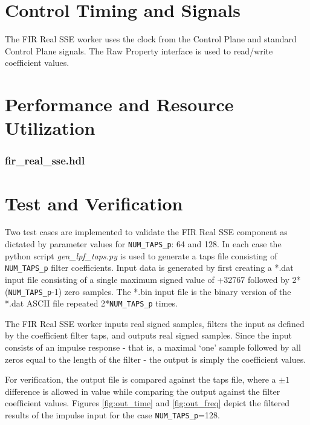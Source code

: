 \documentclass{article}
\def\comp{fir\_real\_sse}
\edef\ecomp{fir_real_sse}
\begin{document}
\section*{Control Timing and Signals}
\begin{flushleft}
	The FIR Real SSE worker uses the clock from the Control Plane and standard Control Plane signals. The Raw Property interface is used to read/write coefficient values.
\end{flushleft}

\section*{Performance and Resource Utilization}
\subsubsection*{\comp.hdl}

\section*{Test and Verification}
\begin{flushleft}
Two test cases are implemented to validate the FIR Real SSE component as dictated by parameter values for \verb+NUM_TAPS_p+: 64 and 128. In each case the python script \textit{gen\_lpf\_taps.py} is used to generate a taps file consisting of \verb+NUM_TAPS_p+ filter coefficients. Input data is generated by first creating a *.dat input file consisting of a single maximum signed value of +32767 followed by 2*(\verb+NUM_TAPS_p+-1) zero samples. The *.bin input file is the binary version of the *.dat ASCII file repeated 2*\verb+NUM_TAPS_p+ times.\medskip

The FIR Real SSE worker inputs real signed samples, filters the input as defined by the coefficient filter taps, and outputs real signed samples. Since the input consists of an impulse response - that is, a maximal `one' sample followed by all zeros equal to the length of the filter - the output is simply the coefficient values.\medskip

For verification, the output file is compared against the taps file, where a $\pm1$ difference is allowed in value while comparing the output against the filter coefficient values. Figures \ref{fig:out_time} and \ref{fig:out_freq} depict the filtered results of the impulse input for the case \verb+NUM_TAPS_p+=128.
\end{flushleft}
\end{document}

